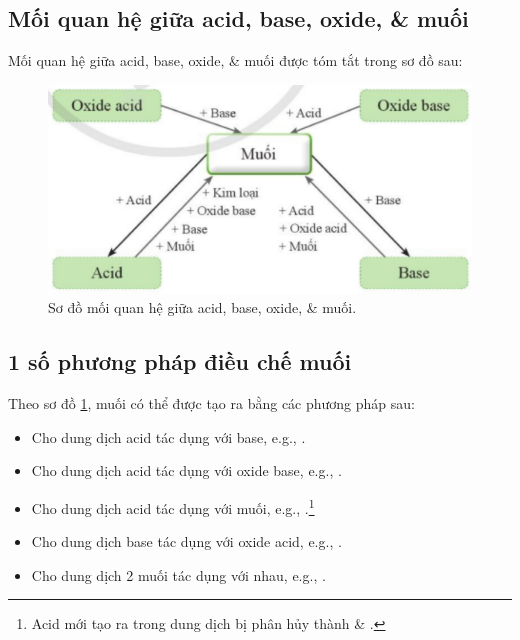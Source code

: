 \documentclass{article}
\begin{document}
\subsection{Mối quan hệ giữa acid, base, oxide, \& muối}
Mối quan hệ giữa acid, base, oxide, \& muối được tóm tắt trong sơ đồ sau:
\begin{figure}[H]
	\centering
	\includegraphics[scale=0.3]{acid_base_oxide_salt}
	\caption{Sơ đồ mối quan hệ giữa acid, base, oxide, \& muối.}
	\label{fig:acid_base_oxide_salt}
\end{figure}

\subsection{1 số phương pháp điều chế muối}
Theo sơ đồ \ref{fig:acid_base_oxide_salt}, muối có thể được tạo ra bằng các phương pháp sau:
\begin{itemize}
	\item Cho dung dịch acid tác dụng với base, e.g., .
	\item Cho dung dịch acid tác dụng với oxide base, e.g., .
	\item Cho dung dịch acid tác dụng với muối, e.g., .\footnote{Acid  mới tạo ra trong dung dịch bị phân hủy thành  \& .}
	\item Cho dung dịch base tác dụng với oxide acid, e.g., .
	\item Cho dung dịch 2 muối tác dụng với nhau, e.g., .
\end{itemize}
\end{document}
